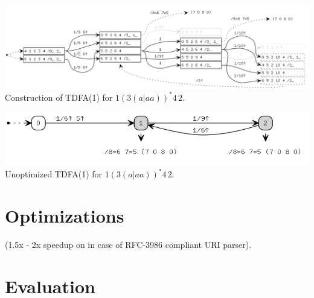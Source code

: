 \documentclass{article}
\theoremstyle{definition}
\begin{document}
\begin{multicols}{2}
\begin{center}
\end{center}
\begin{center}
\includegraphics[width=\linewidth]{img/example4/tdfa1_raw.png}\\
\footnotesize{Construction of TDFA(1) for $1 (3 (a | aa) )^* 4 \, 2$.} \\
\end{center}
\begin{center}
\includegraphics[width=\linewidth]{img/example4/tdfa1.png}\\
\footnotesize{Unoptimized TDFA(1) for $1 (3 (a | aa) )^* 4 \, 2$.} \\
\end{center}



\section{Optimizations}\label{section_optimizations}

(1.5x - 2x speedup on in case of RFC-3986 compliant URI parser).

\section{Evaluation}\label{section_evaluation}


\end{multicols}
\end{document}
